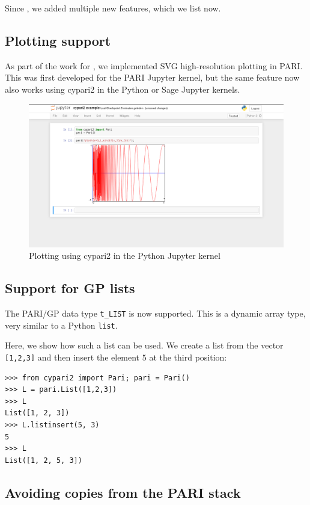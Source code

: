 \documentclass{deliverablereport}
\begin{document}
Since ,
we added multiple new features, which we list now.

\subsection{Plotting support}

As part of the work for ,
we implemented SVG high-resolution plotting in PARI.
This was first developed for the PARI Jupyter kernel,
but the same feature now also works using cypari2
in the Python or Sage Jupyter kernels.

\begin{figure}[ht]
  \includegraphics[width=\textwidth,trim={60px 100px 60px 1px},clip]{jupyter-cypari2.png}
  \caption{Plotting using cypari2 in the Python Jupyter kernel}
\end{figure}

\subsection{Support for GP lists}

The PARI/GP data type \verb/t_LIST/ is now supported.
This is a dynamic array type, very similar to a Python \verb/list/.

Here, we show how such a list can be used.
We create a list from the vector \verb/[1,2,3]/ and then insert the
element $5$ at the third position:
\begin{verbatim}
>>> from cypari2 import Pari; pari = Pari()
>>> L = pari.List([1,2,3])
>>> L
List([1, 2, 3])
>>> L.listinsert(5, 3)
5
>>> L
List([1, 2, 5, 3])
\end{verbatim}

\subsection{Avoiding copies from the PARI stack}
\end{document}
